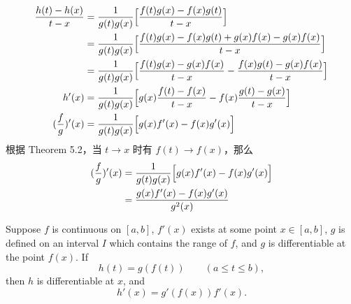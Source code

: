 \documentclass[../poma-notes.tex]{subfiles}
\begin{document}
\begin{anote}
\begin{enumerate}
\begin{align*}
\begin{split}
              \frac{h(t) - h(x)}{t - x} &= \frac{1}{g(t)g(x)} \Bigl[ \frac{f(t)g(x) - f(x)g(t)}{t - x} \Bigr] \\
              &= \frac{1}{g(t)g(x)} \Bigl[\frac{f(t)g(x) - f(x)g(t) + g(x)f(x) - g(x)f(x)}{t-x}\Bigr] \\
              &= \frac{1}{g(t)g(x)} \Bigl[\frac{f(t)g(x) - g(x)f(x)}{t-x} - \frac{f(x)g(t) - g(x)f(x)}{t-x}\Bigr] \\
              h'(x) &= \frac{1}{g(t)g(x)} \Bigl[g(x)\frac{f(t) - f(x)}{t-x} - f(x)\frac{g(t) - g(x)}{t-x}\Bigr] \\
              (\frac{f}{g})'(x) &= \frac{1}{g(t)g(x)} \Bigl[g(x)f'(x) - f(x)g'(x)\Bigr]
            \end{split}
          \end{align*}
          根据 Theorem 5.2，当 $t \to x$ 时有 $f(t) \to f(x)$，那么
          \begin{align*}
            \begin{split}
              (\frac{f}{g})'(x) &= \frac{1}{g(t)g(x)} \Bigl[g(x)f'(x) - f(x)g'(x)\Bigr] \\
              &= \frac{g(x)f'(x) - f(x)g'(x)}{g^2(x)}
            \end{split}
          \end{align*}
  \end{enumerate}
\end{anote}


\begin{theorem}
  Suppose $f$ is continuous on $[a, b]$, $f'(x)$ exists at some point $x \in [a, b]$, $g$ is defined on an
  interval $I$ which contains the range of $f$, and $g$ is differentiable at the point $f(x)$. If
  \[
    h(t) = g(f(t)) \qquad (a \le t \le b),
  \]
  then $h$ is differentiable at $x$, and
  \begin{equation}
    h'(x) = g'(f(x)) f'(x).
  \end{equation}
\end{theorem}
\end{document}
